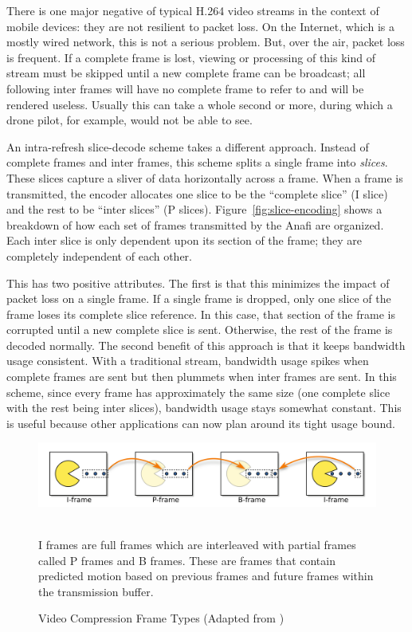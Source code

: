 There is one major negative of typical H.264 video streams in the context of mobile devices: they are not resilient to packet loss. On the Internet, which is a mostly wired network, this is not a serious problem. But, over the air, packet loss is frequent. If a complete frame is lost, viewing or processing of this kind of stream must be skipped until a new complete frame can be broadcast; all following inter frames will have no complete frame to refer to and will be rendered useless. Usually this can take a whole second or more, during which a drone pilot, for example, would not be able to see.

An intra-refresh slice-decode scheme takes a different approach. Instead of complete frames and inter frames, this scheme splits a single frame into \textit{slices}. These slices capture a sliver of data horizontally across a frame. When a frame is transmitted, the encoder allocates one slice to be the ``complete slice'' (I slice) and the rest to be ``inter slices'' (P slices). Figure~\ref{fig:slice-encoding} shows a breakdown of how each set of frames transmitted by the Anafi are organized. Each inter slice is only dependent upon its section of the frame; they are completely independent of each other. 

This has two positive attributes. The first is that this minimizes the impact of packet loss on a single frame. If a single frame is dropped, only one slice of the frame loses its complete slice reference. In this case, that section of the frame is corrupted until a new complete slice is sent. Otherwise, the rest of the frame is decoded normally. The second benefit of this approach is that it keeps bandwidth usage consistent. With a traditional stream, bandwidth usage spikes when complete frames are sent but then plummets when inter frames are sent. In this scheme, since every frame has approximately the same size (one complete slice with the rest being inter slices), bandwidth usage stays somewhat constant. This is useful because other applications can now plan around its tight usage bound.

\begin{figure}
    \centering
    \includegraphics[width=1.0\linewidth]{chapter3/FIGS/compression.png}
    \begin{captext}
    \\[0.1cm] \small I frames are full frames which are interleaved with partial frames called P frames and B frames. These are frames that contain predicted motion based on previous frames and future frames within the transmission buffer.
    \end{captext}
    \caption{Video Compression Frame Types (Adapted from \cite{Wikipedia})}
    \label{fig:compression-demo}
\end{figure}

